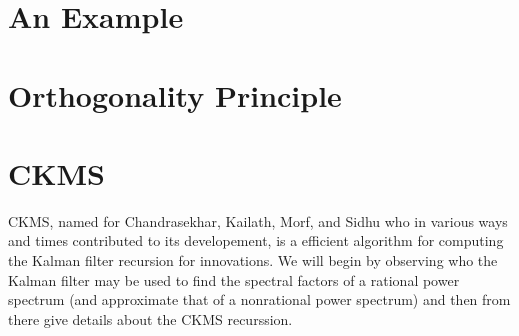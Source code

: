 \documentclass[12pt]{amsart}
\begin{document}
\section{An Example}
\label{sec: Example}

\appendix
\section{Orthogonality Principle}
\label{app: Ortho proof}

\section{CKMS}

CKMS, named for Chandrasekhar, Kailath, Morf, and Sidhu who in various ways and times contributed to its developement, is a efficient algorithm for computing the Kalman filter recursion for innovations. We will begin by observing who the Kalman filter may be used to find the spectral factors of a rational power spectrum (and approximate that of a nonrational power spectrum) and then from there give details about the CKMS recurssion.




\end{document}
